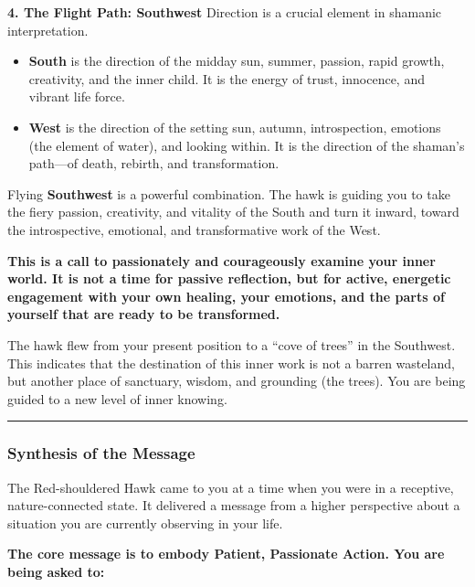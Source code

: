 \documentclass{article}
\begin{document}
\textbf{4. The Flight Path: Southwest} Direction is a crucial element in
shamanic interpretation.

\begin{itemize}
\item
  \textbf{South} is the direction of the midday sun, summer, passion,
  rapid growth, creativity, and the inner child. It is the energy of
  trust, innocence, and vibrant life force.
\item
  \textbf{West} is the direction of the setting sun, autumn,
  introspection, emotions (the element of water), and looking within. It
  is the direction of the shaman's path---of death, rebirth, and
  transformation.
\end{itemize}

Flying \textbf{Southwest} is a powerful combination. The hawk is guiding
you to take the fiery passion, creativity, and vitality of the South and
turn it inward, toward the introspective, emotional, and transformative
work of the West.

\textbf{This is a call to passionately and courageously examine your
inner world. It is not a time for passive reflection, but for active,
energetic engagement with your own healing, your emotions, and the parts
of yourself that are ready to be transformed.}

The hawk flew from your present position to a ``cove of trees'' in the
Southwest. This indicates that the destination of this inner work is not
a barren wasteland, but another place of sanctuary, wisdom, and
grounding (the trees). You are being guided to a new level of inner
knowing.

\begin{center}\rule{0.5\linewidth}{0.5pt}\end{center}

\subsubsection*{Synthesis of the
Message}\label{synthesis-of-the-message}

The Red-shouldered Hawk came to you at a time when you were in a
receptive, nature-connected state. It delivered a message from a higher
perspective about a situation you are currently observing in your life.

\textbf{The core message is to embody Patient, Passionate Action. You
are being asked to:}
\end{document}
